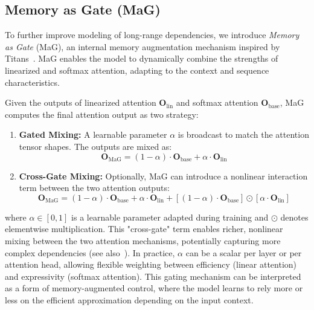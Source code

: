 \documentclass[10pt,a4paper]{article}
\begin{document}


\subsection{Memory as Gate (MaG)}

To further improve modeling of long-range dependencies, we introduce \textit{Memory as Gate} (MaG), an internal memory augmentation mechanism inspired by Titans~\cite{behrouz2024titans}. MaG enables the model to dynamically combine the strengths of linearized and softmax attention, adapting to the context and sequence characteristics.

Given the outputs of linearized attention $\mathbf{O}_{\text{lin}}$ and softmax attention $\mathbf{O}_{\text{base}}$, MaG computes the final attention output as two strategy:
\begin{enumerate}
    \item \textbf{Gated Mixing:} A learnable parameter $\alpha$ is broadcast to match the attention tensor shapes. The outputs are mixed as:
    \begin{equation}
        \mathbf{O}_{\text{MaG}} = (1-\alpha) \cdot \mathbf{O}_{\text{base}} + \alpha \cdot \mathbf{O}_{\text{lin}}
    \end{equation}
    \item \textbf{Cross-Gate Mixing:} Optionally, MaG can introduce a nonlinear interaction term between the two attention outputs:
    \begin{equation}
        \mathbf{O}_{\text{MaG}} = (1-\alpha) \cdot \mathbf{O}_{\text{base}} + \alpha \cdot \mathbf{O}_{\text{lin}} + \left[(1-\alpha) \cdot \mathbf{O}_{\text{base}}\right] \odot \left[\alpha \cdot \mathbf{O}_{\text{lin}}\right]
    \end{equation}
\end{enumerate}

where $\alpha \in [0,1]$ is a learnable parameter adapted during training and $\odot$ denotes elementwise multiplication. This "cross-gate" term enables richer, nonlinear mixing between the two attention mechanisms, potentially capturing more complex dependencies (see also~\cite{munkhdalai2024leave}). In practice, $\alpha$ can be a scalar per layer or per attention head, allowing flexible weighting between efficiency (linear attention) and expressivity (softmax attention). This gating mechanism can be interpreted as a form of memory-augmented control, where the model learns to rely more or less on the efficient approximation depending on the input context.
\end{document}
